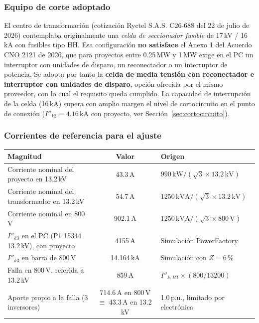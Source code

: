 \documentclass[11pt,a4paper]{article}
\begin{document}
\subsubsection{Equipo de corte adoptado}

El centro de transformaci\'on (cotizaci\'on Ryctel S.A.S. C26-688 del 22 de julio de 2026) contemplaba originalmente una \emph{celda de seccionador fusible} de 17\,kV / 16\,kA con fusibles tipo HH. Esa configuraci\'on \textbf{no satisface} el Anexo 1 del Acuerdo CNO 2121 de 2026, que para proyectos entre 0.25\,MW y 1\,MW exige en el PC un interruptor con unidades de disparo, un reconectador o un interruptor de potencia. Se adopta por tanto la \textbf{celda de media tensi\'on con reconectador e interruptor con unidades de disparo}, opci\'on ofrecida por el mismo proveedor, con lo cual el requisito queda cumplido. La capacidad de interrupci\'on de la celda (16\,kA) supera con amplio margen el nivel de cortocircuito en el punto de conexi\'on ($I''_{k3} = 4.16$\,kA con proyecto, ver Secci\'on~\ref{sec:cortocircuito}).

\subsubsection{Corrientes de referencia para el ajuste}

\begin{center}
\begin{tabular}{|l|c|l|}
\hline
\textbf{Magnitud} & \textbf{Valor} & \textbf{Origen} \\ \hline
Corriente nominal del proyecto en 13.2\,kV & 43.3\,A & $990\,\text{kW}/(\sqrt{3}\times 13.2\,\text{kV})$ \\ \hline
Corriente nominal del transformador en 13.2\,kV & 54.7\,A & $1250\,\text{kVA}/(\sqrt{3}\times 13.2\,\text{kV})$ \\ \hline
Corriente nominal en 800\,V & 902.1\,A & $1250\,\text{kVA}/(\sqrt{3}\times 800\,\text{V})$ \\ \hline
$I''_{k3}$ en el PC (P1 15344 13.2\,kV), con proyecto & 4155\,A & Simulaci\'on PowerFactory \\ \hline
$I''_{k3}$ en barra de 800\,V & 14.164\,kA & Simulaci\'on con $Z=6\,\%$ \\ \hline
Falla en 800\,V, referida a 13.2\,kV & 859\,A & $I''_{k,BT}\times(800/13200)$ \\ \hline
Aporte propio a la falla (3 inversores) & 714.6\,A en 800\,V $\equiv$ 43.3\,A en 13.2\,kV & 1.0\,p.u., limitado por electr\'onica \\ \hline
\end{tabular}
\end{center}
\end{document}
